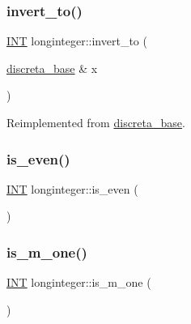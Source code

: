 \subsubsection{\texorpdfstring{invert\+\_\+to()}{invert\_to()}}
{\footnotesize\ttfamily \mbox{\hyperlink{galois_8h_a09fddde158a3a20bd2dcadb609de11dc}{I\+NT}} longinteger\+::invert\+\_\+to (\begin{DoxyParamCaption}\item[{\mbox{\hyperlink{classdiscreta__base}{discreta\+\_\+base}} \&}]{x }\end{DoxyParamCaption})\hspace{0.3cm}{\ttfamily [virtual]}}



Reimplemented from \mbox{\hyperlink{classdiscreta__base_a874a5ffb467f3896604a3c9bdf0cca50}{discreta\+\_\+base}}.

\mbox{\label{classlonginteger_a12ad4725b43f023ed9861d3f48ba69fe}} 
\subsubsection{\texorpdfstring{is\+\_\+even()}{is\_even()}}
{\footnotesize\ttfamily \mbox{\hyperlink{galois_8h_a09fddde158a3a20bd2dcadb609de11dc}{I\+NT}} longinteger\+::is\+\_\+even (\begin{DoxyParamCaption}{ }\end{DoxyParamCaption})}

\mbox{\label{classlonginteger_aa47d6521fc1dc8058d9eaa516caefabe}} 
\subsubsection{\texorpdfstring{is\+\_\+m\+\_\+one()}{is\_m\_one()}}
{\footnotesize\ttfamily \mbox{\hyperlink{galois_8h_a09fddde158a3a20bd2dcadb609de11dc}{I\+NT}} longinteger\+::is\+\_\+m\+\_\+one (\begin{DoxyParamCaption}{ }\end{DoxyParamCaption})\hspace{0.3cm}{\ttfamily [virtual]}}



